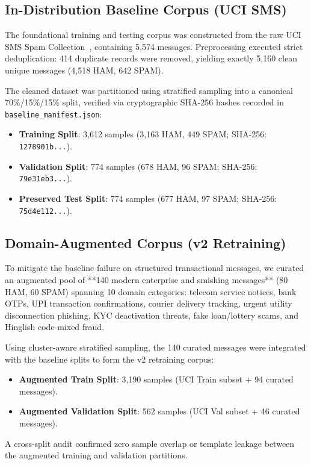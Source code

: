 \documentclass[conference]{IEEEtran}
\begin{document}
\subsection{In-Distribution Baseline Corpus (UCI SMS)}
The foundational training and testing corpus was constructed from the raw UCI SMS Spam Collection~\cite{almeida2011sms}, containing 5,574 messages. Preprocessing executed strict deduplication: 414 duplicate records were removed, yielding exactly 5,160 clean unique messages (4,518 HAM, 642 SPAM).

The cleaned dataset was partitioned using stratified sampling into a canonical 70\%/15\%/15\% split, verified via cryptographic SHA-256 hashes recorded in \texttt{baseline\_manifest.json}:
\begin{itemize}
    \item \textbf{Training Split}: 3,612 samples (3,163 HAM, 449 SPAM; SHA-256: \texttt{1278901b...}).
    \item \textbf{Validation Split}: 774 samples (678 HAM, 96 SPAM; SHA-256: \texttt{79e31eb3...}).
    \item \textbf{Preserved Test Split}: 774 samples (677 HAM, 97 SPAM; SHA-256: \texttt{75d4e112...}).
\end{itemize}

\subsection{Domain-Augmented Corpus (v2 Retraining)}
To mitigate the baseline failure on structured transactional messages, we curated an augmented pool of **140 modern enterprise and smishing messages** (80 HAM, 60 SPAM) spanning 10 domain categories: telecom service notices, bank OTPs, UPI transaction confirmations, courier delivery tracking, urgent utility disconnection phishing, KYC deactivation threats, fake loan/lottery scams, and Hinglish code-mixed fraud.

Using cluster-aware stratified sampling, the 140 curated messages were integrated with the baseline splits to form the v2 retraining corpus:
\begin{itemize}
    \item \textbf{Augmented Train Split}: 3,190 samples (UCI Train subset + 94 curated messages).
    \item \textbf{Augmented Validation Split}: 562 samples (UCI Val subset + 46 curated messages).
\end{itemize}
A cross-split audit confirmed zero sample overlap or template leakage between the augmented training and validation partitions.
\end{document}
